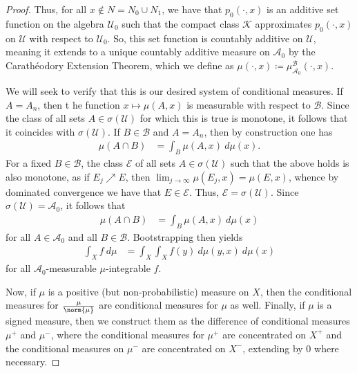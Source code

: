 \documentclass[10pt]{mypackage}
\renewcommand{\coloneq}{\coloneqq}
\begin{document}
\begin{proof}
  Thus, for all $x\notin N = N_0\cup N_1$, we have that $p_0\left( \cdot,x \right)$ is an additive set function on the algebra $\mathcal{U}_0$ such that the compact class $\mathcal{K}$ approximates $p_0\left( \cdot,x \right)$ on $\mathcal{U}$ with respect to $\mathcal{U}_0$. So, this set function is countably additive on $\mathcal{U}$, meaning it extends to a unique countably additive measure on $ \mathcal{A}_0 $ by the Carathéodory Extension Theorem, which we define as $\mu\left( \cdot,x \right)\coloneq \mu^{\mathcal{B}}_{\mathcal{A}_0}\left( \cdot,x \right)$.

  We will seek to verify that this is our desired system of conditional measures. If $A = A_n$, then t he function $x\mapsto \mu\left( A,x \right)$ is measurable with respect to $\mathcal{B}$. Since the class of all sets $A\in \sigma\left( \mathcal{U} \right)$ for which this is true is monotone, it follows that it coincides with $\sigma\left( \mathcal{U} \right)$. If $B\in \mathcal{B}$ and $A = A_n$, then by construction one has
  \begin{align*}
    \mu\left( A\cap B \right) &= \int_{B}^{} \mu\left( A,x \right)\:d\mu(x).
  \end{align*}
  For a fixed $B\in \mathcal{B}$, the class $\mathcal{E}$ of all sets $A\in \sigma\left( \mathcal{U} \right)$ such that the above holds is also monotone, as if $E_j\nearrow E$, then $\lim_{j\to\infty}\mu\left( E_j,x \right) = \mu\left( E,x \right)$, whence by dominated convergence we have that $E\in \mathcal{E}$. Thus, $\mathcal{E} = \sigma\left( \mathcal{U} \right)$. Since $\sigma\left( \mathcal{U} \right) = \mathcal{A}_0$, it follows that
  \begin{align*}
    \mu\left( A\cap B \right) &= \int_{B}^{} \mu\left( A,x \right)\:d\mu(x)
  \end{align*}
  for all $A\in \mathcal{A}_0$ and all $B\in \mathcal{B}$. Bootstrapping then yields
  \begin{align*}
    \int_{X}^{} f\:d\mu &= \int_{X}^{} \int_{X}^{} f(y)\:d\mu(y,x)\:d\mu(x)
  \end{align*}
  for all $\mathcal{A}_0$-measurable $\mu$-integrable $f$.

  Now, if $\mu$ is a positive (but non-probabilistic) measure on $X$, then the conditional measures for $\frac{\mu}{\norm{\mu}}$ are conditional measures for $\mu$ as well. Finally, if $\mu$ is a signed measure, then we construct them as the difference of conditional measures $\mu^{+}$ and $\mu^{-}$, where the conditional measures for $\mu^{+}$ are concentrated on $X^{+}$ and the conditional measures on $\mu^{-}$ are concentrated on $X^{-}$, extending by $0$ where necessary.
\end{proof}
\end{document}
